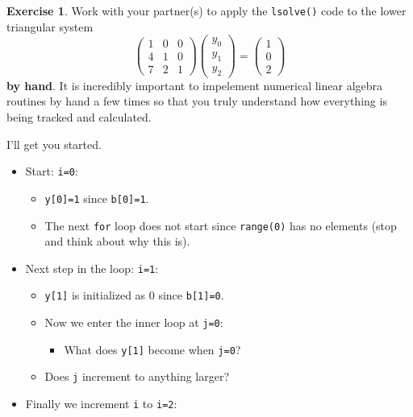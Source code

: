 \documentclass[
]{book}
\providecommand{\tightlist}{%
  \setlength{\itemsep}{0pt}\setlength{\parskip}{0pt}}
\theoremstyle{definition}
\theoremstyle{definition}
\theoremstyle{definition}
\newtheorem{exercise}{Exercise}[chapter]
\theoremstyle{remark}
\begin{document}
\begin{exercise}
\protect\hypertarget{exr:unnamed-chunk-326}{}{\label{exr:unnamed-chunk-326} }Work with your partner(s) to apply the \texttt{lsolve()} code to the lower triangular system\\
\[\begin{pmatrix} 1 & 0 & 0 \\ 4 & 1 & 0 \\ 7 & 2 & 1 \end{pmatrix} \begin{pmatrix} y_0 \\ y_1 \\ y_2 \end{pmatrix} = \begin{pmatrix} 1 \\ 0 \\ 2\end{pmatrix}\]
\textbf{by hand}. It is incredibly important to impelement numerical linear algebra routines by hand a few times so that you truly understand how everything is being tracked and calculated.

I'll get you started.

\begin{itemize}
\tightlist
\item
  Start: \texttt{i=0}:

  \begin{itemize}
  \tightlist
  \item
    \texttt{y{[}0{]}=1} since \texttt{b{[}0{]}=1}.
  \item
    The next \texttt{for} loop does not start since \texttt{range(0)} has no elements (stop and think about why this is).
  \end{itemize}
\item
  Next step in the loop: \texttt{i=1}:

  \begin{itemize}
  \tightlist
  \item
    \texttt{y{[}1{]}} is initialized as 0 since \texttt{b{[}1{]}=0}.
  \item
    Now we enter the inner loop at \texttt{j=0}:

    \begin{itemize}
    \tightlist
    \item
      What does \texttt{y{[}1{]}} become when \texttt{j=0}?
    \end{itemize}
  \item
    Does \texttt{j} increment to anything larger?
  \end{itemize}
\item
  Finally we increment \texttt{i} to \texttt{i=2}:


\end{itemize}
\end{exercise}
\end{document}
